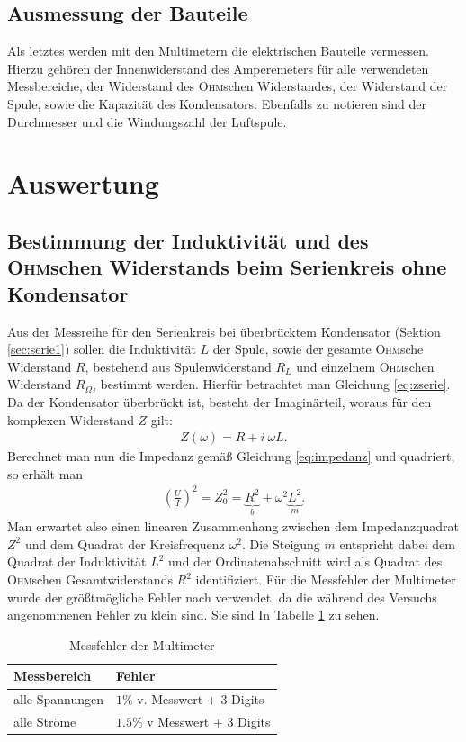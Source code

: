 \documentclass[12pt,a4paper,titlepage,headinclude]{scrartcl}
\numberwithin{equation}{subsection}
\newcommand{\person}[1]{\textsc{#1}}
\begin{document}
\subsection{Ausmessung der Bauteile}
Als letztes werden mit den Multimetern die elektrischen Bauteile vermessen. Hierzu gehören der Innenwiderstand des Amperemeters für alle verwendeten Messbereiche, der Widerstand des \person{Ohm}schen Widerstandes, der Widerstand der Spule, sowie die Kapazität des Kondensators. Ebenfalls zu notieren sind der Durchmesser und die Windungszahl der Luftspule.
\section{Auswertung}
\label{sec:auswertung}
\subsection{Bestimmung der Induktivität und des \person{Ohm}schen Widerstands beim Serienkreis ohne Kondensator}
\label{sec:lin}
Aus der Messreihe für den Serienkreis bei überbrücktem Kondensator (Sektion \ref{sec:serie1}) sollen die Induktivität $L$ der Spule, sowie der gesamte \person{Ohm}sche Widerstand $R$, bestehend aus Spulenwiderstand $R_L$ und einzelnem \person{Ohm}schen Widerstand $R_\Omega$, bestimmt werden. Hierfür betrachtet man Gleichung \eqref{eq:zserie}. Da der Kondensator überbrückt ist, besteht der Imaginärteil, woraus für den komplexen Widerstand $Z$ gilt:
\begin{align}
	Z(\omega)=R+i~\omega L.
	\label{eq:impedRL}
\end{align}
Berechnet man nun die Impedanz gemäß Gleichung \eqref{eq:impedanz} und quadriert, so erhält man
\begin{align}
	\left( \frac{U}{I} \right)^2=Z_0^2=\underbrace{R^2}_b+\omega^2 \underbrace{L^2}_m.
	\label{eq:gerade}
\end{align}
Man erwartet also einen linearen Zusammenhang zwischen dem Impedanzquadrat $Z^2$ und dem Quadrat der Kreisfrequenz $\omega^2$. Die Steigung $m$ entspricht dabei dem Quadrat der Induktivität $L^2$ und der Ordinatenabschnitt wird als Quadrat des \person{Ohm}schen Gesamtwiderstands $R^2$ identifiziert.
Für die Messfehler der Multimeter wurde der größtmögliche Fehler nach \cite[35]{prakti} verwendet, da die während des Versuchs angenommenen Fehler zu klein sind. Sie sind In Tabelle \ref{tab:messfehler} zu sehen.
\begin{table}
	\centering
	\begin{tabular}{l|l}
		\hline
		Messbereich&Fehler\\\hline
		alle Spannungen&$1\%$ v. Messwert + 3 Digits\\
		alle Ströme&$1.5\%$ v Messwert + 3 Digits\\\hline
	\end{tabular}
	\caption{Messfehler der Multimeter}
	\label{tab:messfehler}
\end{table}
\end{document}
